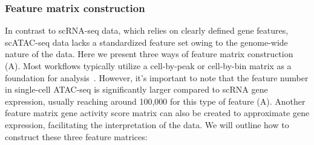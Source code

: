 \subsubsection{Feature matrix construction}
\label{background:sec2:scATAC:matrixconstruction}
In contrast to scRNA-seq data, which relies on clearly defined gene features, scATAC-seq data lacks a standardized feature set owing to the genome-wide nature of the data. Here we present three ways of feature matrix construction (A). Most workflows typically utilize a cell-by-peak or cell-by-bin matrix as a foundation for analysis~\citep{heumos2023best}. However, it's important to note that the feature number in single-cell ATAC-seq is significantly larger compared to scRNA gene expression, usually reaching around 100,000 for this type of feature (A). Another feature matrix gene activity score matrix can also be created to approximate gene expression, facilitating the interpretation of the data. We will outline how to construct these three feature matrices:
